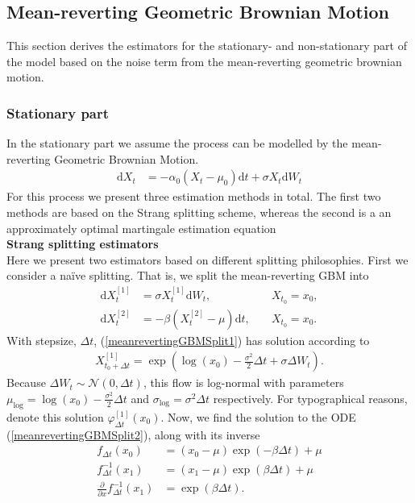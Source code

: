 \subsection{Mean-reverting Geometric Brownian Motion}\label{subsec:meanrevertingGBM}
This section derives the estimators for the stationary- and non-stationary part of the model based on the noise term from the mean-reverting geometric brownian motion.
\subsubsection{Stationary part}\label{subsubsec:meanrevertingGBMStationary}
In the stationary part we assume the process can be modelled by the mean-reverting Geometric Brownian Motion.
\begin{align}
    \mathrm{d}X_t &= -\alpha_0\left(X_t - \mu_0\right)\mathrm{d}t + \sigma X_t \mathrm{d}W_t \label{eq:GBM_simple}
\end{align}
For this process we present three estimation methods in total. The first two methods are based on the Strang splitting scheme, whereas the second is a an approximately optimal martingale estimation equation \\
\noindent \textbf{Strang splitting estimators}\\
Here we present two estimators based on different splitting philosophies. First we consider a naïve splitting. That is, we split the mean-reverting GBM into
\begin{align}
    \mathrm{d}X_t^{[1]} &= \sigma X_t^{[1]}\mathrm{d}W_t, \; &&X_{t_0} = x_0, \label{meanrevertingGBMSplit1}\\
    \mathrm{d}X_t^{[2]} &= -\beta\left(X_t^{[2]} - \mu\right)\mathrm{d}t, \; &&X_{t_0} = x_0. \label{meanrevertingGBMSplit2}
\end{align}
With stepsize, $\Delta t$, (\ref{meanrevertingGBMSplit1}) has solution according to \cite[example 4.7]{Srkk2019}
\begin{align}
    X_{t_0 + \Delta t}^{[1]} = \exp\left(\log(x_0) -\frac{\sigma^2}{2}\Delta t + \sigma \Delta W_t\right).
\end{align}
Because $\Delta W_t\sim\mathcal{N}(0,\Delta t)$, this flow is log-normal with parameters $\mu_{\mathrm{log}} = \log(x_0) -\frac{\sigma^2}{2}\Delta t$ and $\sigma_{\log} = \sigma^2\Delta t$ respectively. For typographical reasons, denote this solution $\varphi_{\Delta t}^{[1]}(x_0)$. Now, we find the solution to the ODE (\ref{meanrevertingGBMSplit2}), along with its inverse 
\begin{align}
    f_{\Delta t}(x_0) &= (x_0 - \mu)\exp(-\beta\Delta t) + \mu \label{eq:meanRevertingODESolution}\\
    f_{\Delta t}^{-1}(x_1) &=  (x_1 - \mu)\exp(\beta\Delta t) + \mu\\
    \frac{\partial}{\partial x} f_{\Delta t}^{-1}(x_1) &= \exp\left(\beta\Delta t\right).
\end{align}
